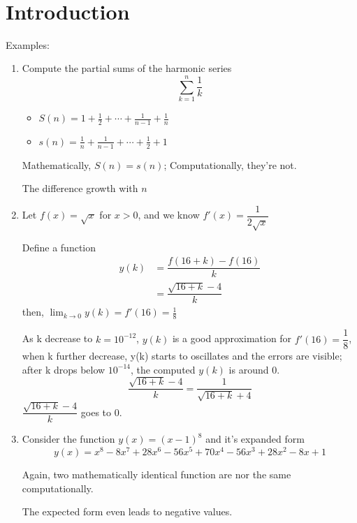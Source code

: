\documentclass[10pt]{article}
\theoremstyle{definition}
\begin{document}
	\begin{center} 
		 \\
	\end{center} 
	\tableofcontents
	\pagebreak
\section{Introduction}
 	 Examples:
 	 \begin{enumerate}
 	 \item  Compute the partial sums of the harmonic series \[\sum_{k=1}^n \frac{1}{k}\]
 	 \begin{itemize}
 	 \item
 	$S(n) = 1+\frac{1}{2}+\cdots +\frac{1}{n-1}+\frac{1}{n}$
 	\item
 	$s(n) =\frac{1}{n} +\frac{1}{n-1}+\cdots +\frac{1}{2}+1$
 	 \end{itemize}
 	 
 	 Mathematically, $S(n) = s(n)$; Computationally, they're not.
 	 
 	 The difference growth with $n$
 	 
 	\item
 	Let $f(x) = \sqrt{x}$ for $x>0$, and we know $f'(x) = \dfrac{1}{2\sqrt{x}}$ 
 	
 	Define a function \begin{align*}
 	y(k) &=\dfrac{f(16+k)-f(16)}{k}\\
 	&=\dfrac{\sqrt{16+k}-4}{k}
 	\end{align*}
 then, $\lim_{k\rightarrow 0} y (k) = f'(16) = \frac{1}{8}$	
 
 As k decrease to $k = 10^{-12}$, $y(k)$ is a good approximation for $f'(16) = \dfrac{1}{8}$, when k further decrease, y(k) starts to oscillates and the  errors are visible; after k drops below $10^{-14}$, the computed $y(k)$ is around 0. 
 \[\dfrac{\sqrt{16+k}-4}{k} = \dfrac{1}{\sqrt{16+k}+4}\]$\dfrac{\sqrt{16+k}-4}{k}$ goes to 0.
 
 \item
 Consider the function $y(x) = (x-1)^8$ and it's expanded form \[y(x) = x^8 -8x^7+28x^6-56x^5+70x^4-56x^3+28x^2-8x+1\]
 
 Again, two mathematically identical function are nor the same computationally. 
 
 The expected form even leads to negative values.
 \end{enumerate} 	
\end{document}
